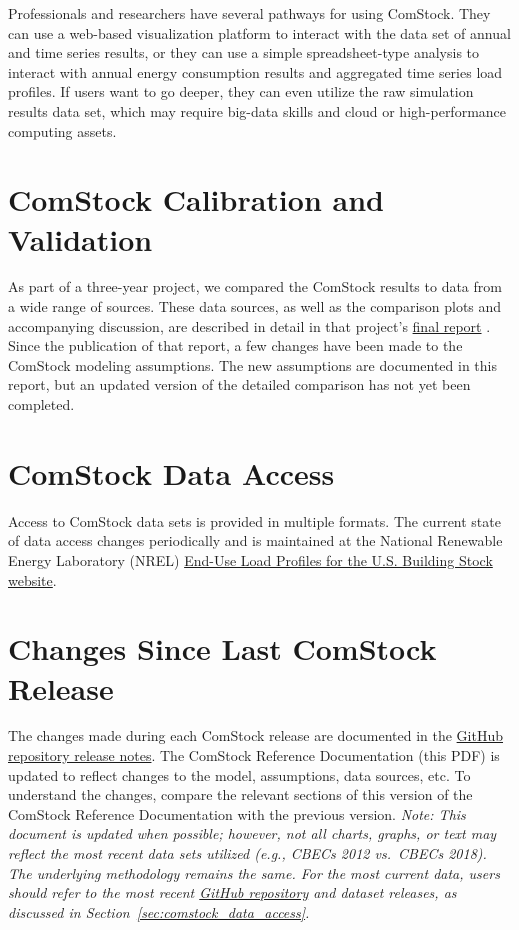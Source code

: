 Professionals and researchers have several pathways for using ComStock. They can use a web-based visualization platform to interact with the data set of annual and time series results, or they can use a simple spreadsheet-type analysis to interact with annual energy consumption results and aggregated time series load profiles. If users want to go deeper, they can even utilize the raw simulation results data set, which may require big-data skills and cloud or high-performance computing assets.

\section{ComStock Calibration and Validation}
As part of a three-year project, we compared the ComStock results to data from a wide range of sources. These data sources, as well as the comparison plots and accompanying discussion, are described in detail in that project's \href{https://www.nrel.gov/docs/fy22osti/80889.pdf}{final report} \citep{eulp_final_report}. Since the publication of that report, a few changes have been made to the ComStock modeling assumptions. The new assumptions are documented in this report, but an updated version of the detailed comparison has not yet been completed.

\section{ComStock Data Access}
Access to ComStock data sets is provided in multiple formats. The current state of data access changes periodically and is maintained at the National Renewable Energy Laboratory (NREL) \href{https://www.nrel.gov/buildings/end-use-load-profiles.html}{End-Use Load Profiles for the U.S. Building Stock website}.

\section{Changes Since Last ComStock Release}
The changes made during each ComStock release are documented in the \href{https://github.com/NREL/ComStock/releases}{GitHub repository release notes}. The ComStock Reference Documentation (this PDF) is updated to reflect changes to the model, assumptions, data sources, etc. To understand the changes, compare the relevant sections of this version of the ComStock Reference Documentation with the previous version. \textit{Note: This document is updated when possible; however, not all charts, graphs, or text may reflect the most recent data sets utilized (e.g., CBECs 2012 vs.\ CBECs 2018). The underlying methodology remains the same. For the most current data, users should refer to the most recent \href{https://github.com/NREL/ComStock}{GitHub repository} and dataset releases, as discussed in Section~\ref{sec:comstock_data_access}.}
